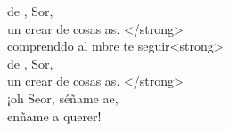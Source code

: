 \begin{cancion}
	 de , Sor,  \\
	un crear de cosas as. </strong>\\
	comprenddo al mbre  te seguir<strong>\\
	 de , Sor,  \\
	un crear de cosas as. </strong>\\
	¡oh Seor, séñame ae,\\
	enñame a querer! \\
\end{cancion}%
